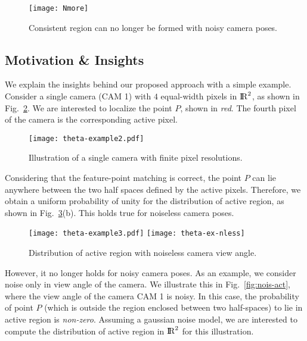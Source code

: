 \begin{figure}[htb]
\centering
\texttt{[image: Nmore]} 
\caption[Illustration of a non-consistent region when the camera poses are noisy.]{Consistent region can no longer be formed with noisy camera poses.}
\label{fig:nmore-example}
\end{figure}

\subsection{Motivation \& Insights}
We explain the insights behind our proposed approach with a simple example. Consider a single camera (CAM 1) with $4$ equal-width pixels in ${\rm I\!R}^{2}$, as shown in Fig.~\ref{fig:one-examp}. We are interested to localize the point $P$, shown in \emph{red}. The fourth pixel of the camera is the corresponding active pixel.

\begin{figure}[htb]
\centering
\texttt{[image: theta-example2.pdf]} 
\caption{Illustration of a single camera with finite pixel resolutions.}
\label{fig:one-examp}
\end{figure}

Considering that the feature-point matching is correct, the point $P$ can lie anywhere between the two half spaces defined by the active pixels. Therefore, we obtain a uniform probability of unity for the distribution of active region, as shown in Fig.~\ref{fig:act-reg}(b). This holds true for noiseless camera poses.

\begin{figure}[htb]
\centering
\texttt{[image: theta-example3.pdf]} 
\texttt{[image: theta-ex-nless]}\\
\caption{Distribution of active region with noiseless camera view angle.}
\label{fig:act-reg}
\end{figure}

However, it no longer holds for noisy camera poses. As an example, we consider noise only in view angle of the camera. We illustrate this in Fig.~\ref{fig:nois-act}, where the view angle of the camera CAM 1 is noisy. In this case, the probability of point $P$ (which is outside the region enclosed between two half-spaces) to lie in active region is \emph{non-zero}. Assuming a gaussian noise model, we are interested to compute the distribution of active region in ${\rm I\!R}^{2}$ for this illustration.

